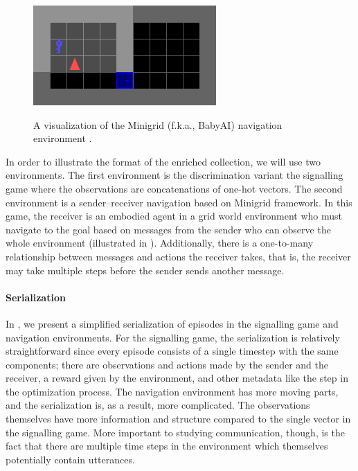 \begin{figure}
  \centering
  \includegraphics[height=1.5in]{chapters/elcc-plus/assets/babyai}
  \caption{A visualization of the Minigrid (f.k.a., BabyAI) navigation environment \protect\citep{chevalier2018babyai,MinigridMiniworld23}.}
  \unskip\label{fig:minigrid}
\end{figure}

In order to illustrate the format of the enriched collection, we will use two environments.
The first environment is the discrimination variant the signalling game where the observations are concatenations of one-hot vectors.
The second environment is a sender--receiver navigation based on Minigrid framework.
In this game, the receiver is an embodied agent in a grid world environment who must navigate to the goal based on messages from the sender who can observe the whole environment (illustrated in ).
Additionally, there is a one-to-many relationship between messages and actions the receiver takes, that is, the receiver may take multiple steps before the sender sends another message.


\paragraph{Serialization}
In , we present a simplified serialization of episodes in the signalling game and navigation environments.
For the signalling game, the serialization is relatively straightforward since every episode consists of a single timestep with the same components;
  there are observations and actions made by the sender and the receiver, a reward given by the environment, and other metadata like the step in the optimization process.
The navigation environment has more moving parts, and the serialization is, as a result, more complicated.
The observations themselves have more information and structure compared to the single vector in the signalling game.
More important to studying communication, though, is the fact that there are multiple time steps in the environment which themselves potentially contain utterances.

